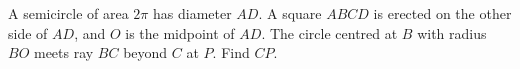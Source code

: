 A semicircle of area $2\pi$ has diameter $AD$. A square $ABCD$ is erected on the other side of $AD$, and $O$ is the midpoint of $AD$. The circle centred at $B$ with radius $BO$ meets ray $BC$ beyond $C$ at $P$. Find $CP$.

